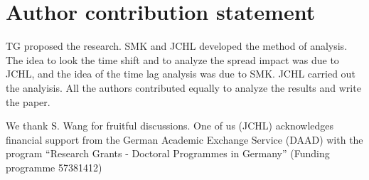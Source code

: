 \section{Author contribution statement}

TG proposed the research. SMK and JCHL developed the method of analysis.
The idea to look the time shift and to analyze the spread impact was due to
JCHL, and the idea of the time lag analysis was due to SMK. JCHL carried out
the analyisis. All the authors contributed equally to analyze the results and
write the paper.

\begin{acknowledgement}
    We thank S. Wang for fruitful discussions.
    One of us (JCHL) acknowledges financial support from the German
    Academic Exchange Service (DAAD) with
    the program ``Research Grants - Doctoral Programmes in Germany''
    (Funding programme 57381412)
\end{acknowledgement}

